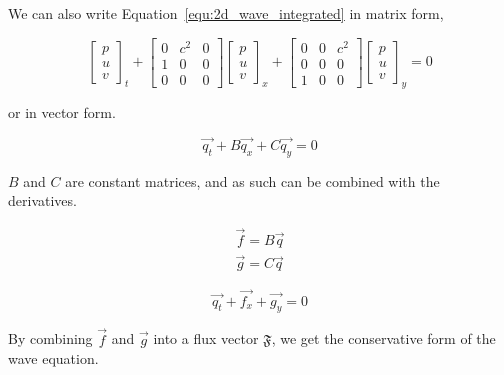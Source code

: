 We can also write Equation~\ref{equ:2d_wave_integrated} in matrix form,

\begin{equation} \label{equ:2d_wave_matrix}
	\begin{bmatrix}
        p \\ 
        u \\ 
        v
	\end{bmatrix}_t +
	\begin{bmatrix}
        0 & c^2 & 0 \\ 
        1 & 0 & 0 \\ 
        0 & 0 & 0
	\end{bmatrix}
	\begin{bmatrix}
        p\\ 
        u\\ 
        v
	\end{bmatrix}_x + 
	\begin{bmatrix}
        0 & 0 & c^2 \\ 
        0 & 0 & 0 \\ 
        1 & 0 & 0
	\end{bmatrix}
	\begin{bmatrix}
        p\\ 
        u\\ 
        v
	\end{bmatrix}_y = 0
\end{equation}

or in vector form.

\begin{equation} \label{equ:2d_wave_vector}
	\overrightarrow{q_t} + B \overrightarrow{q_x} + C \overrightarrow{q_y} = 0
\end{equation}

$B$ and $C$ are constant matrices, and as such can be combined with the derivatives.

\begin{gather}
	\overrightarrow{f} = B \overrightarrow{q} \\
	\overrightarrow{g} = C \overrightarrow{q}
\end{gather}

\begin{equation}
	\overrightarrow{q_t} + \overrightarrow{f_x} + \overrightarrow{g_y} = 0
\end{equation}

By combining $\overrightarrow{f}$ and $\overrightarrow{g}$ into a flux vector $\mathfrak{F}$, we get 
the conservative form of the wave equation.

